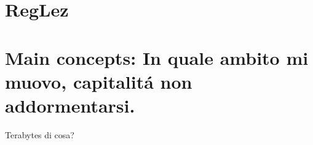 \section{RegLez}


\section{Main concepts: In quale ambito mi muovo, capitalit\'a non addormentarsi.}

\begin{frame}{Terabytes di cosa?}

\end{frame}